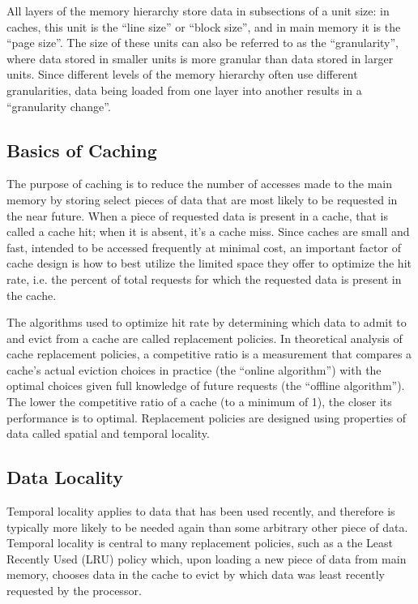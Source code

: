 \documentclass[12pt,twoside]{reedthesis}
\begin{document}
	All layers of the memory hierarchy store data in subsections of a unit size: in caches, this unit is the ``line size'' or ``block size'', and in main memory it is the ``page size''. The size of these units can also be referred to as the ``granularity'', where data stored in smaller units is more granular than data stored in larger units. Since different levels of the memory hierarchy often use different granularities, data being loaded from one layer into another results in a ``granularity change''.

	\subsection*{Basics of Caching}
	
	The purpose of caching is to reduce the number of accesses made to the main memory by storing select pieces of data that are most likely to be requested in the near future. When a piece of requested data is present in a cache, that is called a cache hit; when it is absent, it's a cache miss. Since caches are small and fast, intended to be accessed frequently at minimal cost, an important factor of cache design is how to best utilize the limited space they offer to optimize the hit rate, i.e. the percent of total requests for which the requested data is present in the cache.
	
	The algorithms used to optimize hit rate by determining which data to admit to and evict from a cache are called replacement policies. In theoretical analysis of cache replacement policies, a competitive ratio is a measurement that compares a cache's actual eviction choices in practice (the ``online algorithm'') with the optimal choices given full knowledge of future requests (the ``offline algorithm''). The lower the competitive ratio of a cache (to a minimum of 1), the closer its performance is to optimal. Replacement policies are designed using properties of data called spatial and temporal locality.

	\subsection*{Data Locality}
	
	Temporal locality applies to data that has been used recently, and therefore is typically more likely to be needed again than some arbitrary other piece of data. Temporal locality is central to many replacement policies, such as a the Least Recently Used (LRU) policy which, upon loading a new piece of data from main memory, chooses data in the cache to evict by which data was least recently requested by the processor.
	
\end{document}
